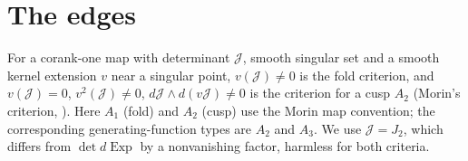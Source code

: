\documentclass[11pt]{article}
\theoremstyle{remark}
\newcommand{\Exp}{\operatorname{Exp}}
\begin{document}
\section{The edges}\label{sec:edges}

For a corank-one map with determinant $\mathcal J$, smooth singular set
and a smooth kernel extension $v$ near a singular point, $v(\mathcal J)\ne0$
is the fold criterion, and $v(\mathcal J)=0$, $v^2(\mathcal J)\ne0$,
$d\mathcal J\wedge d(v\mathcal J)\ne0$ is the criterion for a cusp $A_2$
(Morin's criterion, \cite[Appendix~A, Theorem~A.1]{SajiUmeharaYamada2008Recognition}).
Here $A_1$ (fold) and $A_2$ (cusp) use the Morin map convention;
the corresponding generating-function types are $A_2$ and $A_3$.
We use $\mathcal J=J_2$, which differs from
$\det d\Exp$ by a nonvanishing factor, harmless for both criteria.
\end{document}
